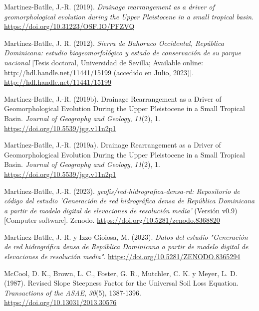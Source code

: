 \documentclass[spanish]{article}
\newlength{\cslhangindent}
\newlength{\cslentryspacingunit} %
\newenvironment{CSLReferences}[2] %
 {%
  \setlength{\parindent}{0pt}
  \ifodd #1
  \let\oldpar\par
  \def\par{\hangindent=\cslhangindent\oldpar}
  \fi
  \setlength{\parskip}{#2\cslentryspacingunit}
 }%
 {}
\begin{document}
\begin{CSLReferences}{1}{0}
\leavevmode{}%
Martinez-Batlle, J.-R. (2019). \emph{Drainage rearrangement as a driver
of geomorphological evolution during the Upper Pleistocene in a small
tropical basin}. \url{https://doi.org/10.31223/OSF.IO/PFZVQ}

\leavevmode{}%
Martínez-Batlle, J. R. (2012). \emph{{Sierra de Bahoruco Occidental,
República Dominicana: estudio biogeomorfológico y estado de conservación
de su parque nacional}} {[}Tesis doctoral, Universidad de Sevilla;
Available online: \url{http://hdl.handle.net/11441/15199} (accedido en
Julio, 2023){]}. \url{http://hdl.handle.net/11441/15199}

\leavevmode{}%
Martínez-Batlle, J.-R. (2019b). Drainage Rearrangement as a Driver of
Geomorphological Evolution During the Upper Pleistocene in a Small
Tropical Basin. \emph{Journal of Geography and Geology}, \emph{11}(2),
1. \url{https://doi.org/10.5539/jgg.v11n2p1}

\leavevmode{}%
Martínez-Batlle, J.-R. (2019a). Drainage Rearrangement as a Driver of
Geomorphological Evolution During the Upper Pleistocene in a Small
Tropical Basin. \emph{Journal of Geography and Geology}, \emph{11}(2),
1. \url{https://doi.org/10.5539/jgg.v11n2p1}

\leavevmode{}%
Martínez-Batlle, J.-R. (2023). \emph{{geofis/red-hidrografica-densa-rd:
Repositorio de código del estudio 'Generación de red hidrográfica densa
de República Dominicana a partir de modelo digital de elevaciones de
resolución media'}} (Versión v0.9) {[}Computer software{]}. Zenodo.
\url{https://doi.org/10.5281/zenodo.8368820}

\leavevmode{}%
Martínez-Batlle, J.-R. y Izzo-Gioiosa, M. (2023). \emph{Datos del
estudio "Generación de red hidrográfica densa de República Dominicana a
partir de modelo digital de elevaciones de resolución media"}.
\url{https://doi.org/10.5281/ZENODO.8365294}

\leavevmode{}%
McCool, D. K., Brown, L. C., Foster, G. R., Mutchler, C. K. y Meyer, L.
D. (1987). Revised Slope Steepness Factor for the Universal Soil Loss
Equation. \emph{Transactions of the ASAE}, \emph{30}(5), 1387-1396.
\url{https://doi.org/10.13031/2013.30576}


\end{CSLReferences}
\end{document}
